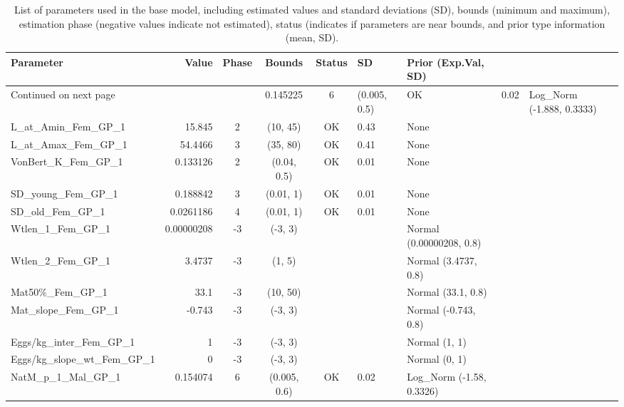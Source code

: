 \documentclass[12pt,]{article}
\begin{document}
\begin{landscape}
\begingroup\fontsize{9pt}{10pt}\selectfont
\begin{longtable}{lrcccll}
\caption{List of parameters used in
                                          the base model, including estimated 
                                          values and standard deviations (SD), 
                                          bounds (minimum and maximum), 
                                          estimation phase (negative values indicate
                                          not estimated), status (indicates if 
                                          parameters are near bounds, and prior type
                                          information (mean, SD).} \\ 
  \hline
Parameter & Value & Phase & Bounds & Status & SD & Prior (Exp.Val, SD)  \\ 
  \hline 
\endhead 
\hline 
\multicolumn{3}{l}{\footnotesize Continued on next page} 
\endfoot 
\endlastfoot 
 \hline
NatM\_p\_1\_Fem\_GP\_1 & 0.145225 & 6 & (0.005, 0.5) & OK & 0.02 & Log\_Norm (-1.888, 0.3333) \\ 
  L\_at\_Amin\_Fem\_GP\_1 & 15.845 & 2 & (10, 45) & OK & 0.43 & None \\ 
  L\_at\_Amax\_Fem\_GP\_1 & 54.4466 & 3 & (35, 80) & OK & 0.41 & None \\ 
  VonBert\_K\_Fem\_GP\_1 & 0.133126 & 2 & (0.04, 0.5) & OK & 0.01 & None \\ 
  SD\_young\_Fem\_GP\_1 & 0.188842 & 3 & (0.01, 1) & OK & 0.01 & None \\ 
  SD\_old\_Fem\_GP\_1 & 0.0261186 & 4 & (0.01, 1) & OK & 0.01 & None \\ 
  Wtlen\_1\_Fem\_GP\_1 & 0.00000208 & -3 & (-3, 3) &  &  & Normal (0.00000208, 0.8) \\ 
  Wtlen\_2\_Fem\_GP\_1 & 3.4737 & -3 & (1, 5) &  &  & Normal (3.4737, 0.8) \\ 
  Mat50\%\_Fem\_GP\_1 & 33.1 & -3 & (10, 50) &  &  & Normal (33.1, 0.8) \\ 
  Mat\_slope\_Fem\_GP\_1 & -0.743 & -3 & (-3, 3) &  &  & Normal (-0.743, 0.8) \\ 
  Eggs/kg\_inter\_Fem\_GP\_1 & 1 & -3 & (-3, 3) &  &  & Normal (1, 1) \\ 
  Eggs/kg\_slope\_wt\_Fem\_GP\_1 & 0 & -3 & (-3, 3) &  &  & Normal (0, 1) \\ 
  NatM\_p\_1\_Mal\_GP\_1 & 0.154074 & 6 & (0.005, 0.6) & OK & 0.02 & Log\_Norm (-1.58, 0.3326) \\ 

\end{longtable}
\end{landscape}
\end{document}
